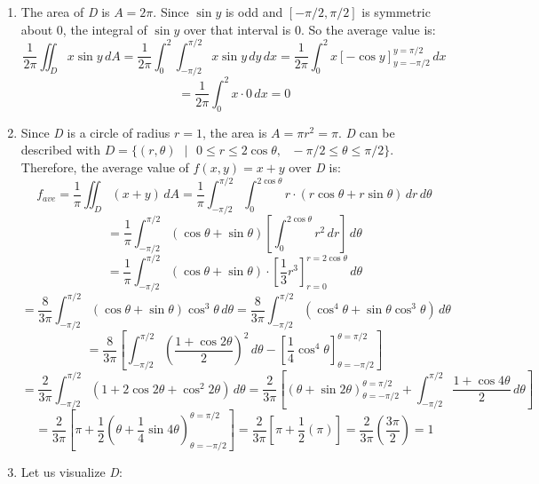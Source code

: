 \begin{Answer}[ref = avg]
\begin{enumerate}
\item The area of \textit{D} is $A = 2\pi$. Since $\sin{y}$ is odd and $[-\pi/2, \pi/2]$ is symmetric about 0, the integral of $\sin{y}$ over that interval is 0. So the average value is:
$$\frac{1}{2\pi} \iint_{\textit{D}} x\sin{y}\,dA = \frac{1}{2\pi} \int_0^2 \int_{-\pi/2}^{\pi/2} x\sin{y}\,dy\,dx = \frac{1}{2\pi} \int_0^2 x \left[ -\cos{y} \right]_{y = -\pi/2}^{y = \pi/2}\,dx$$
$$= \frac{1}{2\pi} \int_0^2 x \cdot 0\,dx = 0$$

\item Since \textit{D} is a circle of radius $r = 1$, the area is $A = \pi r^2 
= \pi$. \textit{D} can be described with $\textit{D} = \{ (r, \theta)\text{ }|
\text{ } 0 \leq r \leq 2\cos{\theta},\text{ } -\pi/2 \leq \theta \leq \pi/2\}$.
Therefore, the average value of $f(x, y) = x + y$ over \textit{D} is:
$$f_{ave} = \frac{1}{\pi} \iint_{\textit{D}} \left(x + y \right)\,dA = 
\frac{1}{\pi} \int_{-\pi/2}^{\pi/2} \int_0^{2\cos{\theta}} r \cdot \left(r\cos{
\theta} + r\sin{\theta} \right)\,dr\,d\theta$$
$$= \frac{1}{\pi} \int_{-\pi/2}^{\pi/2} \left(\cos{\theta} + \sin{\theta} 
\right) \left[\int_0^{2\cos{\theta}} r^2 \,dr \right]\,d\theta$$
$$= \frac{1}{\pi} \int_{-\pi/2}^{\pi/2} \left(\cos{\theta} + \sin{\theta} 
\right) \cdot \left[ \frac{1}{3} r^3 \right]_{r = 0}^{r = 2\cos{\theta}}\,d
\theta$$
$$= \frac{8}{3\pi} \int_{-\pi/2}^{\pi/2} \left(\cos{\theta} + \sin{\theta} 
\right) \cos^3{\theta}\,d\theta = \frac{8}{3\pi} \int_{-\pi/2}^{\pi/2} \left( 
\cos^4{\theta} + \sin{\theta} \cos^3{\theta} \right)\,d\theta$$
$$= \frac{8}{3\pi} \left[ \int_{-\pi/2}^{\pi/2} \left( \frac{1 + \cos{2
\theta}}{2} \right)^2\,d\theta - \left[ \frac{1}{4} \cos^4{\theta} \right]_{
\theta = -\pi/2}^{\theta = \pi/2} \right]$$
$$= \frac{2}{3\pi} \int_{-\pi/2}^{\pi/2} \left(1 + 2\cos{2\theta} + \cos^2{2
\theta} \right)\,d\theta = \frac{2}{3\pi} \left[ \left(\theta + \sin{2\theta} 
\right)_{\theta = -\pi/2}^{\theta = \pi/2} + \int_{-\pi/2}^{\pi/2} \frac{1 + 
\cos{4\theta}}{2}\,d\theta \right]$$
$$= \frac{2}{3\pi} \left[ \pi + \frac{1}{2} \left(\theta + \frac{1}{4}\sin{4
\theta} \right)_{\theta = -\pi/2}^{\theta = \pi/2} \right] = \frac{2}{3\pi} 
\left[ \pi + \frac{1}{2} \left( \pi \right) \right] = \frac{2}{3\pi} \left( 
\frac{3\pi}{2} \right) = 1$$
\item Let us visualize \textit{D}:



\end{enumerate}
\end{Answer}
